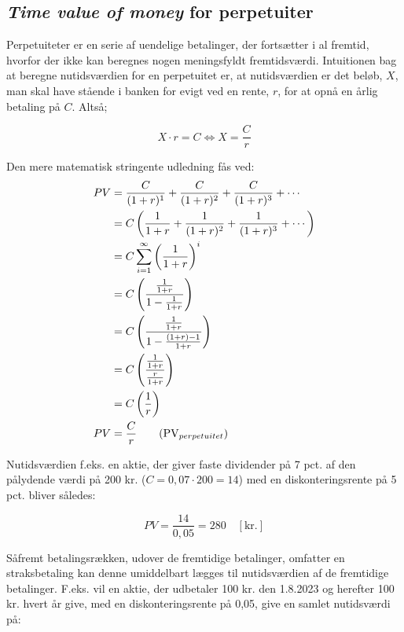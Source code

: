 \documentclass[10pt,reqno, usenames]{article}
\begin{document}
\subsection{\textit{Time value of money} for perpetuiter}
Perpetuiteter er en serie af uendelige betalinger, der fortsætter i al fremtid, hvorfor der ikke kan beregnes nogen meningsfyldt fremtidsværdi. Intuitionen bag at beregne nutidsværdien for en perpetuitet er, at nutidsværdien er det beløb, $X$, man skal have stående i banken for evigt ved en rente, $r$, for at opnå en årlig betaling på $C$. Altså; 


\begin{equation*}
    X \cdot r = C \Longleftrightarrow X = \frac{C}{r}
\end{equation*}

Den mere matematisk stringente udledning fås ved: 
{\allowdisplaybreaks
\begin{align*}
PV &= \frac{C}{(1 + r)^1} + \frac{C}{(1 + r)^2} + \frac{C}{(1 + r)^3} + \cdots \\
   &= C \left( \frac{1}{1 + r} + \frac{1}{(1 + r)^2} + \frac{1}{(1 + r)^3} + \cdots \right) \\
   &= C \sum_{i=1}^{\infty} \left( \frac{1}{1 + r} \right)^i \\
   &= C \left( \frac{\frac{1}{1 + r}}{1 - \frac{1}{1 + r}} \right)  \\
   &= C \left( \frac{\frac{1}{1 + r}}{1 - \frac{(1+r)-1}{1 + r}} \right)  \\
   &= C \left( \frac{\frac{1}{1 + r}}{\frac{r}{1 + r}} \right) \\
   &= C \left( \frac{1}{r} \right) \\
PV &= \frac{C}{r} \tag{PV$_{perpetuitet}$}
\end{align*}
}

Nutidsværdien f.eks. en aktie, der giver faste dividender på 7 pct. af den pålydende værdi på 200 kr. ($C = 0,07 \cdot 200 = 14$) med en diskonteringsrente på 5 pct. bliver således: 

\begin{equation*}
    PV = \frac{14}{0,05} = 280 \quad [\text{kr.}]
\end{equation*}

Såfremt betalingsrækken, udover de fremtidige betalinger, omfatter en straksbetaling kan denne umiddelbart lægges til nutidsværdien af de fremtidige betalinger. F.eks. vil en aktie, der udbetaler 100 kr. den 1.8.2023 og herefter 100 kr. hvert år give, med en diskonteringsrente på 0,05, give en samlet nutidsværdi på: 
\end{document}
